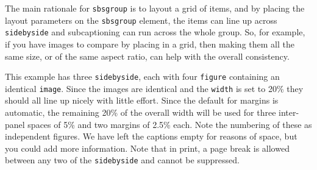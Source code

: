 \documentclass[10pt,]{article}
\theoremstyle{plain}
\theoremstyle{definition}
\theoremstyle{definition}
\theoremstyle{definition}
\theoremstyle{definition}
\theoremstyle{definition}
\theoremstyle{definition}
\numberwithin{equation}{section}
\begin{document}
\hypertarget{p-731}{}%
The main rationale for \lstinline?sbsgroup? is to layout a grid of items, and by placing the layout parameters on the \lstinline?sbsgroup? element, the items can line up across \lstinline?sidebyside? and subcaptioning can run across the whole group.  So, for example, if you have images to compare by placing in a grid, then making them all the same size, or of the same aspect ratio, can help with the overall consistency.%
\par
\hypertarget{p-732}{}%
This example has three \lstinline?sidebyside?, each with four \lstinline?figure? containing an identical \lstinline?image?.  Since the images are identical and the \lstinline?width? is set to 20\% they should all line up nicely with little effort.  Since the default for margins is automatic, the remaining 20\% of the overall width will be used for three inter-panel spaces of 5\% and two margins of 2.5\% each.  Note the numbering of these as independent figures.  We have left the captions empty for reasons of space, but you could add more information.  Note that in print, a page break is allowed between any two of the \lstinline?sidebyside? and cannot be suppressed.%
\end{document}
